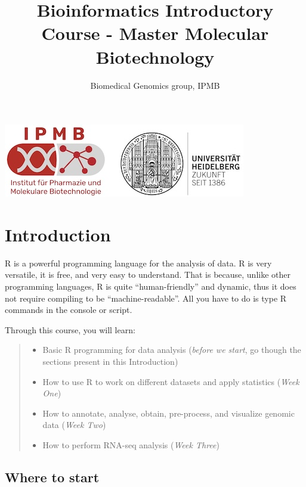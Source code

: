 \documentclass[
]{book}
\title{Bioinformatics Introductory Course - Master Molecular Biotechnology}
\author{Biomedical Genomics group, IPMB}
\date{}
\providecommand{\tightlist}{%
  \setlength{\itemsep}{0pt}\setlength{\parskip}{0pt}}
\begin{document}
\maketitle

{
\setcounter{tocdepth}{1}
\tableofcontents
}
\includegraphics{./logos_IPMB_final_202309.jpg}

\hypertarget{introduction}{%
\chapter*{Introduction}\label{introduction}}

R is a powerful programming language for the analysis of data.
R is very versatile, it is free, and very easy to understand.
That is because, unlike other programming languages, R is quite ``human-friendly'' and dynamic, thus it does not require compiling to be ``machine-readable''.
All you have to do is type R commands in the console or script.

Through this course, you will learn:

\begin{quote}
\begin{itemize}
\tightlist
\item
  Basic R programming for data analysis (\emph{before we start}, go though the sections present in this Introduction)
\item
  How to use R to work on different datasets and apply statistics (\emph{Week One})
\item
  How to annotate, analyse, obtain, pre-process, and visualize genomic data (\emph{Week Two})
\item
  How to perform RNA-seq analysis (\emph{Week Three})
\end{itemize}
\end{quote}

\hypertarget{where-to-start}{%
\section*{Where to start}\label{where-to-start}}
\end{document}
